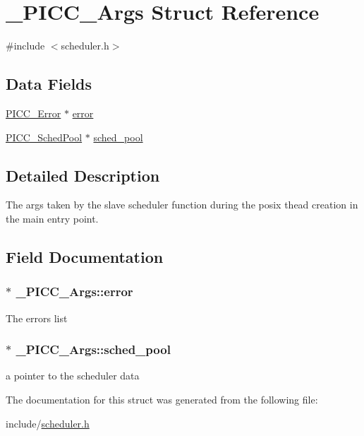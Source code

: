 \hypertarget{struct__PICC__Args}{\section{\-\_\-\-P\-I\-C\-C\-\_\-\-Args Struct Reference}
\label{struct__PICC__Args}
}


{\ttfamily \#include $<$scheduler.\-h$>$}

\subsection*{Data Fields}
{\bf }\par
\begin{DoxyCompactItemize}
\item 
\hyperlink{error_8h_af89348b58191950b36702ace17a79c0b}{P\-I\-C\-C\-\_\-\-Error} $\ast$ \hyperlink{struct__PICC__Args_aa2e1a576c0abcd43c6ed9df015888cff}{error}
\item 
\hyperlink{scheduler_8h_a53817fd01b91a5a89175368b546dd8b9}{P\-I\-C\-C\-\_\-\-Sched\-Pool} $\ast$ \hyperlink{struct__PICC__Args_a1b7f6b9a092e92f3e36581da63709bc7}{sched\-\_\-pool}
\end{DoxyCompactItemize}



\subsection{Detailed Description}
The args taken by the slave scheduler function during the posix thead creation in the main entry point. 

\subsection{Field Documentation}
\hypertarget{struct__PICC__Args_aa2e1a576c0abcd43c6ed9df015888cff}{
\subsubsection[{error}]{$\ast$ \-\_\-\-P\-I\-C\-C\-\_\-\-Args\-::error}}\label{struct__PICC__Args_aa2e1a576c0abcd43c6ed9df015888cff}
The errors list \hypertarget{struct__PICC__Args_a1b7f6b9a092e92f3e36581da63709bc7}{
\subsubsection[{sched\-\_\-pool}]{$\ast$ \-\_\-\-P\-I\-C\-C\-\_\-\-Args\-::sched\-\_\-pool}}\label{struct__PICC__Args_a1b7f6b9a092e92f3e36581da63709bc7}
a pointer to the scheduler data 

The documentation for this struct was generated from the following file\-:\begin{DoxyCompactItemize}
\item 
include/\hyperlink{scheduler_8h}{scheduler.\-h}\end{DoxyCompactItemize}
